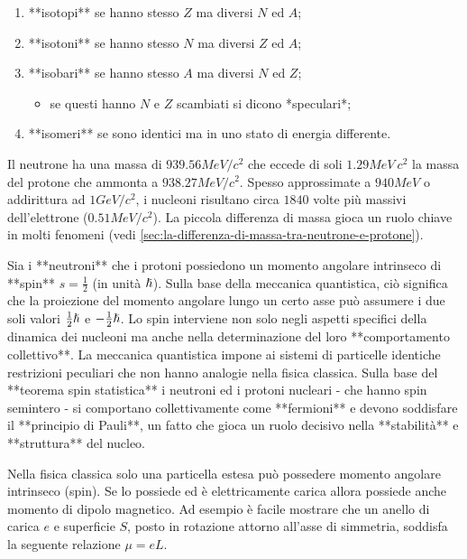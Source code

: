 \begin{enumerate}
    \item **isotopi** se hanno stesso $Z$ ma diversi $N$ ed $A$;
    \item  **isotoni** se hanno stesso $N$ ma diversi $Z$ ed $A$;
    \item **isobari** se hanno stesso $A$ ma diversi $N$ ed $Z$;
    \begin{itemize}
        \item  se questi hanno $N$ e $Z$ scambiati si dicono *speculari*;
    \end{itemize}
    \item **isomeri** se sono identici ma in uno stato di energia differente.
\end{enumerate}

Il neutrone ha una massa di $939.56 MeV/c^2$ che eccede di soli $1.29 MeV \ c^2$ la massa del protone che ammonta a $938.27 MeV/c^2$.
Spesso approssimate a $940 MeV$ o addirittura ad $1 GeV/c^2$, i nucleoni risultano circa $1840$ volte più massivi dell'elettrone ($0.51 MeV/c^2$).
La piccola differenza di massa gioca un ruolo chiave in molti fenomeni (vedi \ref{sec:la-differenza-di-massa-tra-neutrone-e-protone}).

Sia i **neutroni** che i protoni possiedono un momento angolare intrinseco di **spin** $s=\frac{1}{2}$ (in unità $\hslash$).
Sulla base della meccanica quantistica, ciò significa che la proiezione del momento angolare lungo un certo asse può assumere i due soli valori $\frac{1}{2} \hslash$ e $-\frac{1}{2}\hslash$.
Lo spin interviene non solo negli aspetti specifici della dinamica dei nucleoni ma anche nella determinazione del loro **comportamento collettivo**.
La meccanica quantistica impone ai sistemi di particelle identiche restrizioni peculiari che non hanno analogie nella fisica classica.
Sulla base del **teorema spin statistica** i neutroni ed i protoni nucleari - che hanno spin semintero - si comportano collettivamente come **fermioni** e devono soddisfare il **principio di Pauli**, un fatto che gioca un ruolo decisivo nella **stabilità** e **struttura** del nucleo.



Nella fisica classica solo una particella estesa può possedere momento angolare intrinseco (spin).
Se lo possiede ed è elettricamente carica allora possiede anche momento di dipolo magnetico.
Ad esempio è facile mostrare che un anello di carica $e$ e superficie $S$, posto in rotazione attorno all'asse di simmetria, soddisfa la seguente relazione $\mu = e L$.

